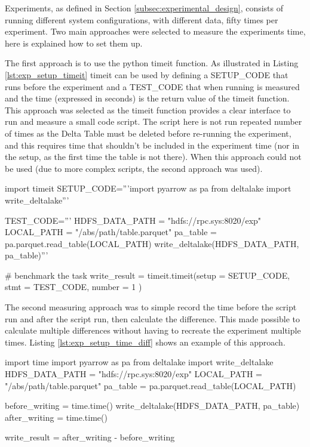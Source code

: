 Experiments, as defined in Section \ref{subsec:experimental_design}, consists of running different system configurations, with different data, fifty times per experiment. Two main approaches were selected to measure the experiments time, here is explained how to set them up.

The first approach is to use the python timeit function. As illustrated in Listing \ref{lst:exp_setup_timeit} timeit can be used by defining a SETUP\_CODE that runs before the experiment and a TEST\_CODE that when running is measured and the time (expressed in seconds) is the return value of the timeit function. This approach was selected as the timeit function provides a clear interface to run and measure a small code script. The script here is not run repeated number of times as the Delta Table must be deleted before re-running the experiment, and this requires time that shouldn't be included in the experiment time (nor in the setup, as the first time the table is not there). When this approach could not be used (due to more complex scripts, the second approach was used).

\begin{python}[caption={Timeit usage to measure the time required to write a Delta Lake table to \gls{HopsFS}.}, label={lst:exp_setup_timeit}]
import timeit
SETUP_CODE='''import pyarrow as pa
from deltalake import write_deltalake'''
    
TEST_CODE='''
HDFS_DATA_PATH = "hdfs://rpc.sys:8020/exp" 
LOCAL_PATH = "/abs/path/table.parquet"
pa_table = pa.parquet.read_table(LOCAL_PATH)
write_deltalake(HDFS_DATA_PATH, pa_table)'''

# benchmark the task
write_result = timeit.timeit(setup  = SETUP_CODE,
                             stmt   = TEST_CODE,
                             number = 1          )
\end{python}
\medskip

The second measuring approach was to simple record the time before the script run and after the script run, then calculate the difference. This made possible to calculate multiple differences without having to recreate the experiment multiple times. Listing \ref{lst:exp_setup_time_diff} shows an example of this approach.

\begin{python}[caption={A simple time difference approach to measure the time required to write a Delta Lake table to \gls{HopsFS}.}, label={lst:exp_setup_time_diff}]
import time
import pyarrow as pa
from deltalake import write_deltalake
HDFS_DATA_PATH = "hdfs://rpc.sys:8020/exp" 
LOCAL_PATH = "/abs/path/table.parquet"
pa_table = pa.parquet.read_table(LOCAL_PATH)

before_writing = time.time()
write_deltalake(HDFS_DATA_PATH, pa_table)
after_writing = time.time()

write_result = after_writing - before_writing
\end{python}

